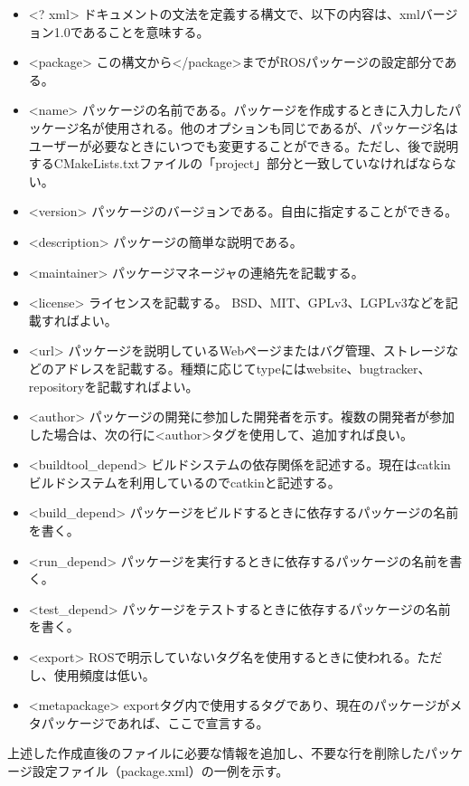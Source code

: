 \vspace{\baselineskip}
\begin{itemize}
\item <? xml> ドキュメントの文法を定義する構文で、以下の内容は、xmlバージョン1.0であることを意味する。
\item <package> この構文から</package>までがROSパッケージの設定部分である。
\item <name> パッケージの名前である。パッケージを作成するときに入力したパッケージ名が使用される。他のオプションも同じであるが、パッケージ名はユーザーが必要なときにいつでも変更することができる。ただし、後で説明するCMakeLists.txtファイルの「project」部分と一致していなければならない。
\item <version> パッケージのバージョンである。自由に指定することができる。
\item <description> パッケージの簡単な説明である。
\item <maintainer> パッケージマネージャの連絡先を記載する。
\item <license> ライセンスを記載する。 BSD、MIT、GPLv3、LGPLv3などを記載すればよい。
\item <url> パッケージを説明しているWebページまたはバグ管理、ストレージなどのアドレスを記載する。種類に応じてtypeにはwebsite、bugtracker、repositoryを記載すればよい。
\item <author> パッケージの開発に参加した開発者を示す。複数の開発者が参加した場合は、次の行に<author>タグを使用して、追加すれば良い。
\item <buildtool\_depend> ビルドシステムの依存関係を記述する。現在はcatkinビルドシステムを利用しているのでcatkinと記述する。
\item <build\_depend> パッケージをビルドするときに依存するパッケージの名前を書く。
\item <run\_depend> パッケージを実行するときに依存するパッケージの名前を書く。
\item <test\_depend> パッケージをテストするときに依存するパッケージの名前を書く。
\item <export> ROSで明示していないタグ名を使用するときに使われる。ただし、使用頻度は低い。
\item <metapackage> exportタグ内で使用するタグであり、現在のパッケージがメタパッケージであれば、ここで宣言する。
\end{itemize}
\vspace{\baselineskip}

上述した作成直後のファイルに必要な情報を追加し、不要な行を削除したパッケージ設定ファイル（package.xml）の一例を示す。

